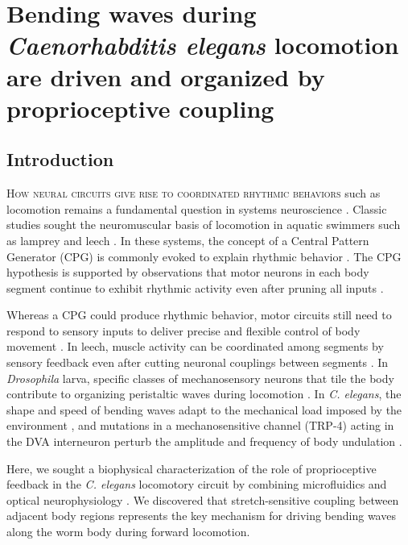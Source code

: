 
\chapter{Bending waves during \textit{Caenorhabditis elegans} locomotion are driven and organized by proprioceptive coupling }\label{chapter:proprioceptive}


\section{Introduction}
\lettrine{H}{ow neural circuits give rise to coordinated rhythmic behaviors} such as locomotion remains a fundamental question in systems neuroscience 
\citep{delcomyn_neural_1980}. Classic studies sought the neuromuscular 
basis of locomotion in aquatic swimmers such as lamprey and leech \citep{marder_principles_1996,kristan_rhythmic_1976,cohen_neuronal_1980,friesen_neuronal_1978,ermentrout_frequency_1984}. In these systems, the concept of a Central Pattern Generator (CPG) is commonly evoked to explain rhythmic behavior \citep{delcomyn_neural_1980,marder_principles_1996}. The CPG hypothesis is supported by observations that motor neurons in each body segment continue to exhibit rhythmic activity even after pruning all inputs \citep{kristan_rhythmic_1976,cohen_neuronal_1980,pearce_intersegmental_1984}.




Whereas a CPG could produce rhythmic behavior, motor circuits still need to respond to sensory 
inputs to deliver precise and flexible control of body movement \citep{delcomyn_neural_1980}. In leech, muscle activity can be coordinated among segments by sensory feedback even after cutting neuronal couplings between segments \citep{yu_sensory_1999}. In \textit{Drosophila} larva, specific classes of mechanosensory neurons that tile the body contribute to organizing peristaltic waves during locomotion \citep{hughes_sensory_2007,song_peripheral_2007,cheng_role_2010}. In \textit{C. 
elegans}, the shape and speed of bending waves adapt to the mechanical load imposed by the 
environment \citep{fang-yen_biomechanical_2010,berri_forward_2009}, and mutations in a mechanosensitive channel (TRP-4) acting in the DVA 
interneuron perturb the amplitude and frequency of body undulation \citep{li_c._2006}.


Here, we sought a biophysical characterization of the role of proprioceptive feedback in the \textit{C. elegans} locomotory circuit by combining microfluidics and optical neurophysiology \citep{liewald_optogenetic_2008,chronis_microfluidics_2007,zhang_multimodal_2007,clark_temporal_2007,lockery_artificial_2008}. We discovered that stretch-sensitive coupling between adjacent body regions represents the key mechanism for driving bending waves along the worm body during forward locomotion.





